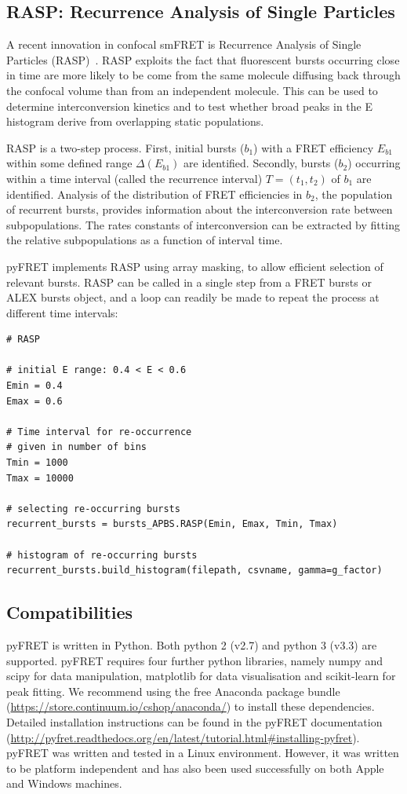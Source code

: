 \subsection*{RASP: Recurrence Analysis of Single Particles}
A recent innovation in confocal smFRET is Recurrence Analysis of Single Particles (RASP)~\cite{hoffmann11}. RASP exploits the fact that fluorescent bursts occurring close in time are more likely to be come from the same molecule diffusing back through the confocal volume than from an independent molecule. This can be used to determine interconversion kinetics and to test whether broad peaks in the E histogram derive from overlapping static populations.

RASP is a two-step process. First, initial bursts ($b_1$) with a FRET efficiency $E_{b1}$ within some defined range $\Delta(E_{b1})$ are identified. Secondly, bursts ($b_2$) occurring within a time interval (called the recurrence interval) $T = (t_1, t_2)$ of $b_1$ are identified. Analysis of the distribution of FRET efficiencies in $b_2$, the population of recurrent bursts, provides information about the interconversion rate between subpopulations. The rates constants of interconversion can be extracted by fitting the relative subpopulations as a function of interval time.

pyFRET implements RASP using array masking, to allow efficient selection of relevant bursts. RASP can be called in a single step from a FRET bursts or ALEX bursts object, and a loop can readily be made to repeat the process at different time intervals:

\begin{lstlisting}
# RASP

# initial E range: 0.4 < E < 0.6
Emin = 0.4
Emax = 0.6

# Time interval for re-occurrence
# given in number of bins
Tmin = 1000
Tmax = 10000

# selecting re-occurring bursts
recurrent_bursts = bursts_APBS.RASP(Emin, Emax, Tmin, Tmax)

# histogram of re-occurring bursts
recurrent_bursts.build_histogram(filepath, csvname, gamma=g_factor)
\end{lstlisting} 

\subsection*{Compatibilities}
pyFRET is written in Python. Both python 2 (v2.7) and python 3 (v3.3) are supported. pyFRET requires four further python libraries, namely numpy and scipy for data manipulation, matplotlib for data visualisation and scikit-learn for peak fitting. We recommend using the free Anaconda package bundle (\url{https://store.continuum.io/cshop/anaconda/}) to install these dependencies. Detailed installation instructions can be found in the pyFRET documentation (\url{http://pyfret.readthedocs.org/en/latest/tutorial.html#installing-pyfret}). pyFRET was written and tested in a Linux environment. However, it was written to be platform independent and has also been used successfully on both Apple and Windows machines.

